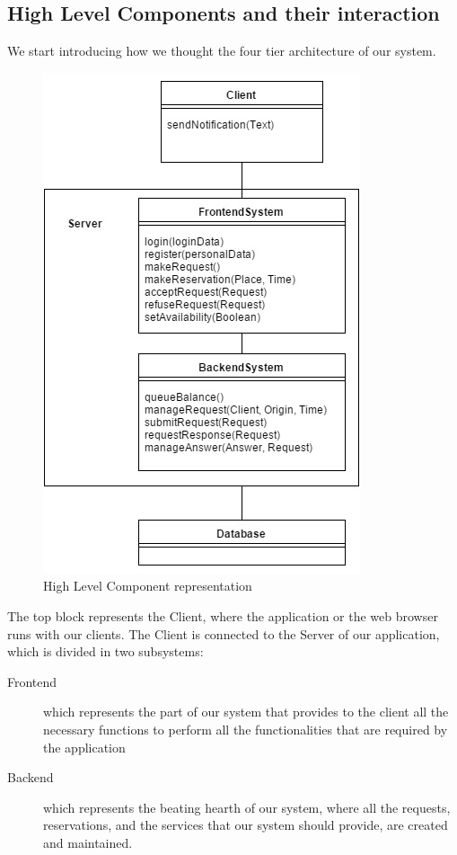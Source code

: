 	\subsection{High Level Components and their interaction}
	\label{subsec:High Level Components and their interaction}
	We start introducing how we thought the four tier architecture of our system.
	\begin{figure}[h!]
		\begin{center}
			\includegraphics[height=0.5\textheight]{../SE2_IMAGES/HLC}
			\caption{High Level Component representation}
		\end{center}
	\end{figure}
	The top block represents the Client, where the application or the web browser runs with our	clients.
	The Client is connected to the Server of our application, which is divided in two subsystems:
	\begin{description}
		\item[Frontend] which represents the part of our system that provides to the client all the necessary
		functions to perform all the functionalities that are required by the application
		\item[Backend] which represents the beating hearth of our system, where all the requests, reservations,
		and the services that our system should provide, are created and maintained.
	\end{description}
